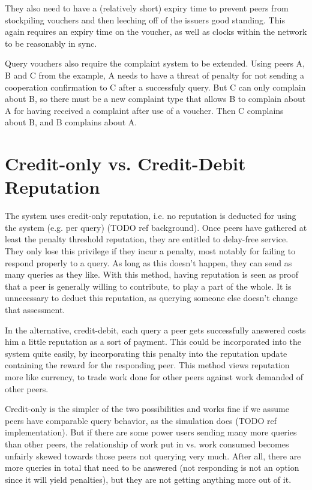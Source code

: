 They also need to have a (relatively short) expiry time to prevent peers from
stockpiling vouchers and then leeching off of the issuers good standing. This
again requires an expiry time on the voucher, as well as clocks within the
network to be reasonably in sync.

Query vouchers also require the complaint system to be extended. Using peers A,
B and C from the example, A needs to have a threat of penalty for not sending a
cooperation confirmation to C after a successfuly query. But C can only complain
about B, so there must be a new complaint type that allows B to complain about A
for having received a complaint after use of a voucher. Then C complains about
B, and B complains about A.

\section{Credit-only vs. Credit-Debit Reputation}
\label{sec:desc_credit_only_vs_credit_debit}
The system uses credit-only reputation, i.e. no reputation is deducted for using
the system (e.g. per query) (TODO ref background). Once peers have gathered at
least the penalty threshold reputation, they are entitled to delay-free service.
They only lose this privilege if they incur a penalty, most notably for failing
to respond properly to a query. As long as this doesn't happen, they can send as
many queries as they like. With this method, having reputation is seen as proof
that a peer is generally willing to contribute, to play a part of the whole. It
is unnecessary to deduct this reputation, as querying someone else doesn't
change that assessment.

In the alternative, credit-debit, each query a peer gets successfully answered
costs him a little reputation as a sort of payment. This could be incorporated
into the system quite easily, by incorporating this penalty into the reputation
update containing the reward for the responding peer. This method views
reputation more like currency, to trade work done for other peers against work
demanded of other peers.

Credit-only is the simpler of the two possibilities and works fine if we assume
peers have comparable query behavior, as the simulation does (TODO ref
implementation). But if there are some power users sending many more queries
than other peers, the relationship of work put in vs. work consumed becomes
unfairly skewed towards those peers not querying very much. After all, there are
more queries in total that need to be answered (not responding is not an option
since it will yield penalties), but they are not getting anything more out of
it.

